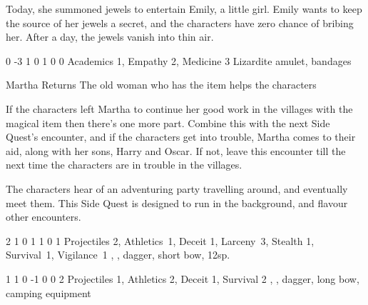 \begin{multicols}{2}
Today, she summoned jewels to entertain Emily, a little girl.
Emily wants to keep the source of her jewels a secret, and the characters have zero chance of bribing her.
After a day, the jewels vanish into thin air.


	{0}%
	{-3}%
	{{1}%
	{0}%
	{1}}%
	{0}%
	{0}%
	{Academics 1, Empathy 2, Medicine 3}%
	{Lizardite amulet, bandages}%
	{}

{Martha Returns}%
{The old woman who has the item helps the characters}%

If the characters left Martha to continue her good work in the villages with the magical item then there's one more part.
Combine this with the next Side Quest's encounter, and if the characters get into trouble, Martha comes to their aid, along with her sons, Harry and Oscar.
If not, leave this encounter till the next time the characters are in trouble in the villages.



\stopcontents[sq]

\startcontents[Forest]
\resumecontents[Villages]
\stopcontents[Forest]
\stopcontents[Villages]

\startcontents[sq]

\sqminitoc

\noindent
The characters hear of an adventuring party travelling around, and eventually meet them.
This Side Quest is designed to run in the background, and flavour other encounters.

{2}%
{1}%
{{0}%
{1}%
{1}}%
{0}%
{1}%
{Projectiles 2, Athletics~1, Deceit 1, Larceny~3, Stealth 1, Survival~1, Vigilance~1\knacks{\precisestrike, \quickshot}}%
{\shortsword, \partialleather, dagger, short bow, 12sp.}%
{\addtocounter{fp}{5}}

{1}%
{1}%
{{0}%
{-1}%
{0}}%
{0}%
{2}%
{Projectiles 1, Athletics 2, Deceit 1, Survival 2\knacks{\adrenalinesurge, \unstoppable, \finishingblow, \charge}}%
{\greatsword, \partialchain, dagger, long bow, camping equipment}%
{}


\end{multicols}
